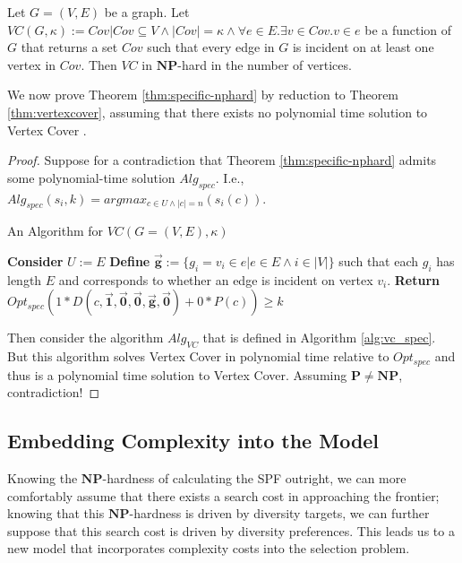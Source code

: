 \begin{theorem}\label{thm:vertexcover}
    Let $G = (V, E)$ be a graph. Let $VC(G, \kappa) := Cov | Cov \subseteq V \land |Cov| = \kappa \land \forall e \in E . \exists v \in Cov . v \in e$ be a function of $G$ that returns a set $Cov$ such that every edge in $G$ is incident on at least one vertex in $Cov$. Then $VC$ in $\mathbf{NP}$-hard in the number of vertices.
\end{theorem}

We now prove Theorem \ref{thm:specific-nphard} by reduction to Theorem \ref{thm:vertexcover}, assuming that there exists no polynomial time solution to Vertex Cover \cite{COPPERSMITH198527}.

\begin{proof}
Suppose for a contradiction that Theorem \ref{thm:specific-nphard} admits some polynomial-time solution $Alg_{spec}$. I.e., $Alg_{spec}(s_i, k )= argmax_{c \in U \land |c| = n}(s_i(c))$.

\begin{algorithm}
    \caption{An Algorithm for $VC(G = (V,E), \kappa)$}\label{alg:vc_spec}
    \begin{algorithmic}
        \State \textbf{Consider} $U := E$
        \State \textbf{Define} $\vec{\mathbf{g}} := \{g_i = v_i \in e | e \in E \land i \in |V|\}$ such that each $g_i$ has length $E$ and corresponds to whether an edge is incident on vertex $v_i$.
        \State \textbf{Return} $Opt_{spec}(1*D(c, \vec{\mathbf{1}}, \vec{\mathbf{0}}, \vec{\mathbf{0}}, \vec{\mathbf{g}}, \vec{\mathbf{0}})+ 0*P(c)) \geq k$
    \end{algorithmic}
\end{algorithm}

Then consider the algorithm $Alg_{VC}$ that is defined in Algorithm \ref{alg:vc_spec}. But this algorithm solves Vertex Cover in polynomial time relative to $Opt_{spec}$ and thus is a polynomial time solution to Vertex Cover. Assuming $\mathbf{P} \neq \mathbf{NP}$, contradiction!
\end{proof}

\subsection{Embedding Complexity into the Model}\label{subsec:dts_w_complexity}
Knowing the $\mathbf{NP}$-hardness of calculating the SPF outright, we can more comfortably assume that there exists a search cost in approaching the frontier; knowing that this $\mathbf{NP}$-hardness is driven by diversity targets, we can further suppose that this search cost is driven by diversity preferences. This leads us to a new model that incorporates complexity costs into the selection problem.

